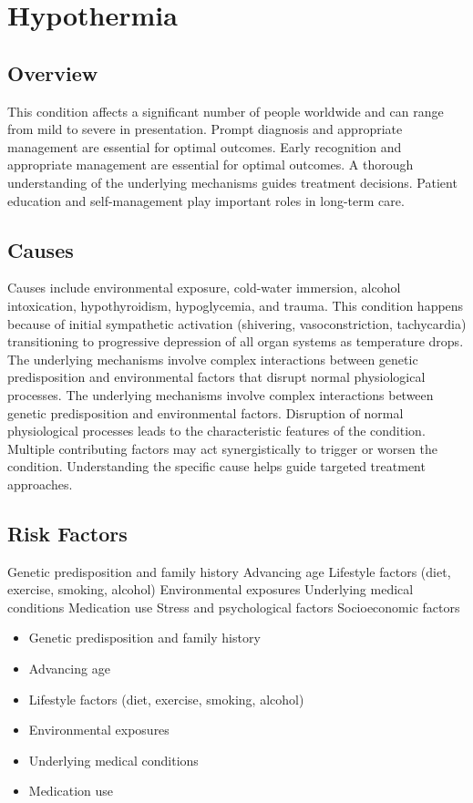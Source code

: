 \chapter{Hypothermia}
\label{sec:Hypothermia}

\section{Overview}
This condition affects a significant number of people worldwide and can range from mild to severe in presentation. Prompt diagnosis and appropriate management are essential for optimal outcomes. Early recognition and appropriate management are essential for optimal outcomes. A thorough understanding of the underlying mechanisms guides treatment decisions. Patient education and self-management play important roles in long-term care.
\section{Causes}
Causes include environmental exposure, cold-water immersion, alcohol intoxication, hypothyroidism, hypoglycemia, and trauma. This condition happens because of initial sympathetic activation (shivering, vasoconstriction, tachycardia) transitioning to progressive depression of all organ systems as temperature drops. The underlying mechanisms involve complex interactions between genetic predisposition and environmental factors that disrupt normal physiological processes. The underlying mechanisms involve complex interactions between genetic predisposition and environmental factors. Disruption of normal physiological processes leads to the characteristic features of the condition. Multiple contributing factors may act synergistically to trigger or worsen the condition. Understanding the specific cause helps guide targeted treatment approaches.
\section{Risk Factors}
Genetic predisposition and family history Advancing age Lifestyle factors (diet, exercise, smoking, alcohol) Environmental exposures Underlying medical conditions Medication use Stress and psychological factors Socioeconomic factors

\begin{itemize}[noitemsep]
  \item Genetic predisposition and family history
  \item Advancing age
  \item Lifestyle factors (diet, exercise, smoking, alcohol)
  \item Environmental exposures
  \item Underlying medical conditions
  \item Medication use
\end{itemize}
